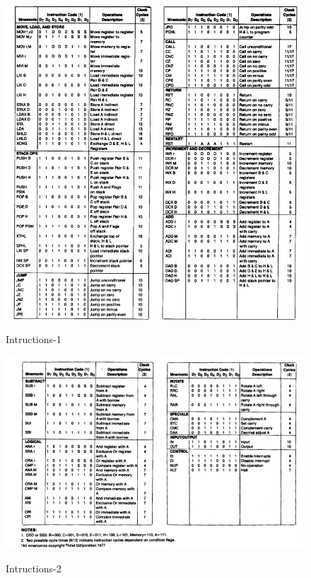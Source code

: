 \documentclass[conference]{IEEEtran}
\begin{document}
\begin{figure}[!h]
\begin{center}
{\scalebox{0.9} {\includegraphics{in1.jpg}}}
\caption{Intructions-1}
\end{center}
\end{figure}\newpage\clearpage
\begin{figure}[!h]
\begin{center}
{\scalebox{0.9} {\includegraphics{in2.jpg}}}\newpage
\caption{Intructions-2}
\end{center}
\end{figure}\newpage
\end{document}
